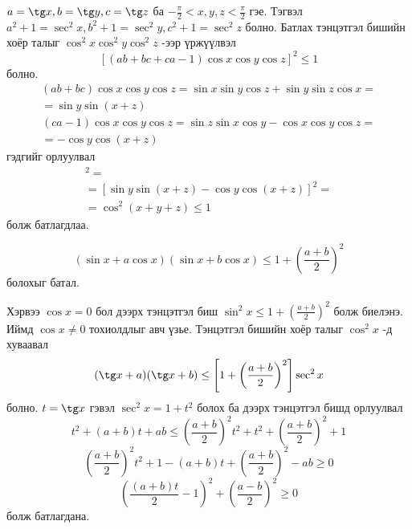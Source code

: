\documentclass[10pt,a4paper,oneside]{book}
\begin{document}
\TheSolution
$a= \tg x, b = \tg y, c = \tg z$ ба $-\frac{\pi}{2}<x,y,z<\frac{\pi}{2}$ гэе. Тэгвэл $a^2 + 1 = \sec^2 x, b^2 + 1 = \sec^2 y, c^2 + 1 = \sec^2 z$ болно. Батлах тэнцэтгэл бишийн хоёр талыг $\cos^2 x\cos^2 y \cos^2 z$ -ээр үржүүлвэл
\begin{equation*}
\left[ (ab+bc+ca-1)\cos x\cos y \cos z\right]^2 \leq 1
\end{equation*}
болно.
\begin{align*}
(ab+bc)\cos x\cos y\cos z = \sin x\sin y\cos z + \sin y\sin z\cos x = \\
 = \sin y\sin (x+z)
\end{align*}
\begin{align*}
(ca - 1) \cos x \cos y\cos z = \sin z\sin x\cos y - \cos x \cos y \cos z = \\
= -\cos y \cos(x+z)
\end{align*}
гэдгийг орлуулвал
\begin{align*}
[(ab+bc+ca - 1)\cos x\cos y\cos z]^2 = \\
= [\sin y \sin(x+z) - \cos y \cos(x+z)]^2 = \\
 = \cos^2(x+y+z) \leq 1
\end{align*}
болж батлагдлаа.


\Problem
\begin{equation*}
(\sin x + a\cos x)(\sin x + b\cos x) \leq 1 + \left(\frac{a+b}{2}\right)^2
\end{equation*}
болохыг батал.

\TheSolution
Хэрвээ $\cos x = 0$ бол дээрх тэнцэтгэл биш $\sin^2 x \leq 1+ \left(\frac{a+b}{2}\right)^2$ болж биелэнэ. Иймд $\cos x \neq 0$ тохиолдлыг авч үзье. Тэнцэтгэл бишийн хоёр талыг $\cos^2 x$ -д хуваавал
\begin{equation*}
(\tg x + a)(\tg x + b) \leq \left[1+ \left(\frac{a+b}{2}\right)^2 \right]\sec^2 x
\end{equation*}
болно. $t = \tg x$ гэвэл $\sec^2 x = 1+t^2$ болох ба дээрх тэнцэтгэл бишд орлуулвал
\begin{equation*}
t^2 + (a+b)t + ab \leq \left(\frac{a+b}{2}\right)^2 t^2 + t^2 + \left(\frac{a+b}{2}\right)^2 + 1
\end{equation*}
\begin{equation*}
\left(\frac{a+b}{2}\right)^2 t^2 + 1 - (a+b)t + \left(\frac{a+b}{2}\right)^2 - ab \geq 0
\end{equation*}
\begin{equation*}
\left(\frac{(a+b)t}{2} - 1\right)^2 + \left(\frac{a-b}{2}\right)^2 \geq 0
\end{equation*}
болж батлагдана.
\end{document}
